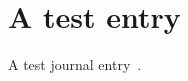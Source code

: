 \documentclass[11pt,a4paper,twoside]{article}
\begin{document}

\section{A test entry}
A test journal entry~\cite{Test2017}.

\printbibliography{}
\printindex
\end{document}

